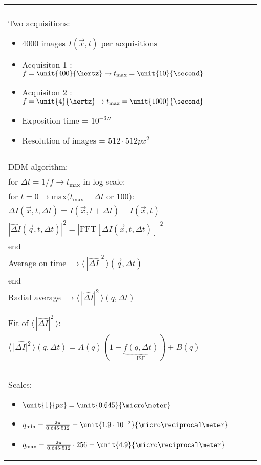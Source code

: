 \documentclass[%
 aip,
 jmp,%
 amsmath,amssymb,
reprint,%
]{revtex4-1}
\begin{document}
\begin{tabular}{ |p{0.98\linewidth}| }
  \hline
  \\  
  Two acquisitions:
  \begin{itemize}
  \item 4000 images $I(\vec{x},t)$ per acquisitions
  \item Acquisiton 1 : $f=\unit{400}{\hertz} \rightarrow t_\text{max} = \unit{10}{\second}$
  \item Acquisiton 2 : $f=\unit{4}{\hertz} \rightarrow t_\text{max} = \unit{1000}{\second}$
  \item Exposition time = $\unit{10^{-3}}{\second}$
  \item Resolution of images = $\unit{512 \cdot 512}{px^2}$
  \end{itemize}
  \\
  \hline
  \\
  DDM algorithm:\\[2ex]
  \hspace{0.3cm} for $\Delta t = 1/f \rightarrow t_\text{max}$ in log scale: \\[1ex]
  \hspace{0.6cm} for $t = 0 \rightarrow \text{max}(t_\text{max}- \Delta t$ or $100)$: \\
  \hspace{0.9cm} $\Delta I(\vec{x},t,\Delta t) = I(\vec{x},t+\Delta t) - I(\vec{x},t)$\\
  \hspace{0.9cm} $|\widehat{\Delta I}(\vec{q},t,\Delta t)|^2 = |\text{FFT}[\Delta I(\vec{x},t,\Delta t)]|^2$\\
  \hspace{0.6cm} end\\[1ex]
  \hspace{0.6cm} Average on time $\rightarrow \langle \, |\widehat{\Delta I}|^2 \, \rangle (\vec{q}, \Delta t)$\\
  \hspace{0.3cm} end\\[1ex]
  \hspace{0.3cm} Radial average $\rightarrow \langle \, |\widehat{\Delta I}|^2 \, \rangle (q, \Delta t)$\\
  \\
  \hline\\
  Fit of $\langle \, |\widehat{\Delta I}|^2 \, \rangle$:\\[2ex]
  \hspace{0.3cm} $\langle \, \widehat{|\Delta I}|^2 \, \rangle (q, \Delta t) = A(q)(1-\underbrace{f(q, \Delta t)}_\text{ISF})+B(q)$ \\
  \\
  \hline\\
  Scales:
  \begin{itemize}
  \item $\unit{1}{px} = \unit{0.645}{\micro\meter}$
  \item $q_\text{min} = \frac{2 \pi}{0.645 \cdot 512} = \unit{1.9\cdot10^{-2}}{\micro\reciprocal\meter}$
  \item $q_\text{max} = \frac{2 \pi}{0.645 \cdot 512}\cdot 256 = \unit{4.9}{\micro\reciprocal\meter}$
  \end{itemize}\\
  \hline
\end{tabular}
\end{document}
